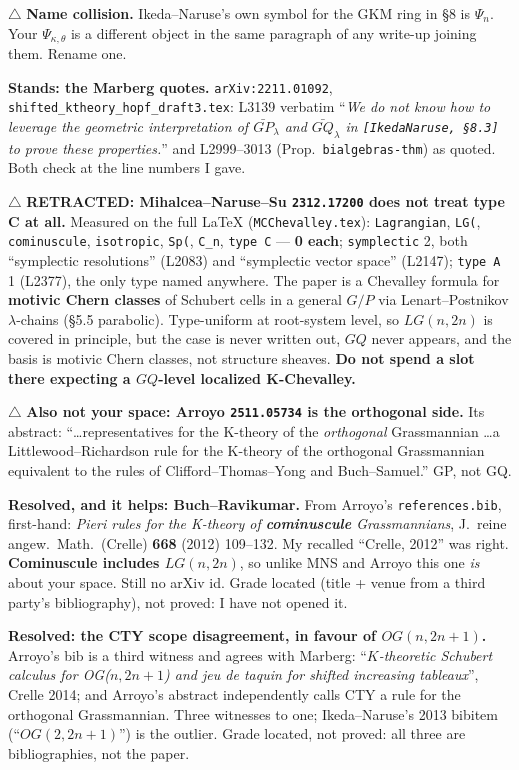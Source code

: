 \documentclass[10pt]{article}
\newcommand{\gr}[1]{\textsf{\small #1}}
\begin{document}
$\triangle$ \textbf{Name collision.} Ikeda--Naruse's own symbol for the GKM ring in \S8 is $\Psi_n$. Your
$\Psi_{\kappa,\theta}$ is a different object in the same paragraph of any write-up joining them. Rename one.

\textbf{Stands: the Marberg quotes.} \texttt{arXiv:2211.01092}, \texttt{shifted\_ktheory\_hopf\_draft3.tex}:
L3139 verbatim ``\emph{We do not know how to leverage the geometric interpretation of $\bar{GP}_\lambda$ and
$\bar{GQ}_\lambda$ in \texttt{[IkedaNaruse, \S8.3]} to prove these properties.}'' and L2999--3013
(Prop.\ \texttt{bialgebras-thm}) as quoted. Both check at the line numbers I gave.

$\triangle$ \textbf{RETRACTED: Mihalcea--Naruse--Su \texttt{2312.17200} does not treat type C at all.}
Measured on the full LaTeX (\texttt{MCChevalley.tex}): \texttt{Lagrangian}, \texttt{LG(},
\texttt{cominuscule}, \texttt{isotropic}, \texttt{Sp(}, \texttt{C\_n}, \texttt{type C} --- \textbf{0 each};
\texttt{symplectic} 2, both ``symplectic resolutions'' (L2083) and ``symplectic vector space'' (L2147);
\texttt{type A} 1 (L2377), the only type named anywhere. The paper is a Chevalley formula for \textbf{motivic
Chern classes} of Schubert cells in a general $G/P$ via Lenart--Postnikov $\lambda$-chains (\S5.5 parabolic).
Type-uniform at root-system level, so $LG(n,2n)$ is covered in principle, but the case is never written out,
$GQ$ never appears, and the basis is motivic Chern classes, not structure sheaves. \textbf{Do not spend a slot
there expecting a $GQ$-level localized K-Chevalley.}

$\triangle$ \textbf{Also not your space: Arroyo \texttt{2511.05734} is the orthogonal side.} Its abstract:
``\dots representatives for the K-theory of the \emph{orthogonal} Grassmannian \dots a Littlewood--Richardson
rule for the K-theory of the orthogonal Grassmannian equivalent to the rules of Clifford--Thomas--Yong and
Buch--Samuel.'' GP, not GQ.

\textbf{Resolved, and it helps: Buch--Ravikumar.} From Arroyo's \texttt{references.bib}, first-hand:
\emph{Pieri rules for the K-theory of \textbf{cominuscule} Grassmannians}, J.\ reine angew.\ Math.\ (Crelle)
\textbf{668} (2012) 109--132. My recalled ``Crelle, 2012'' was right. \textbf{Cominuscule includes $LG(n,2n)$},
so unlike MNS and Arroyo this one \emph{is} about your space. Still no arXiv id. Grade \gr{located} (title +
venue from a third party's bibliography), not \gr{proved}: I have not opened it.

\textbf{Resolved: the CTY scope disagreement, in favour of $OG(n,2n{+}1)$.} Arroyo's bib is a third witness and
agrees with Marberg: ``\emph{$K$-theoretic Schubert calculus for OG($n,2n{+}1$) and jeu de taquin for shifted
increasing tableaux}'', Crelle 2014; and Arroyo's abstract independently calls CTY a rule for the orthogonal
Grassmannian. Three witnesses to one; Ikeda--Naruse's 2013 bibitem (``$OG(2,2n{+}1)$'') is the outlier. Grade
\gr{located}, not \gr{proved}: all three are bibliographies, not the paper.
\end{document}

